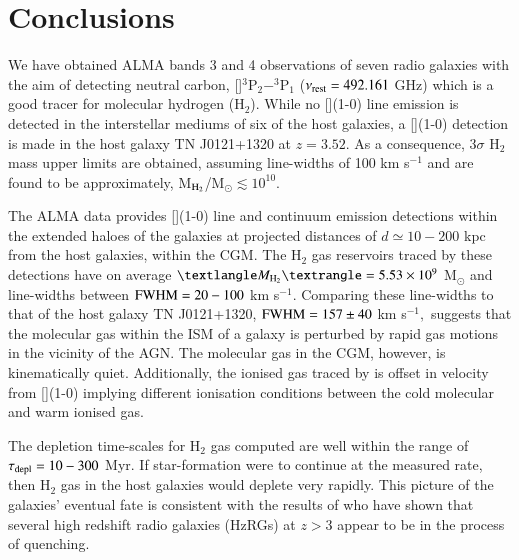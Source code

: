 \section{Conclusions}

We have obtained ALMA bands 3 and 4 observations of seven radio galaxies with the aim of detecting neutral carbon, []$^3$P$_2 - ^3$P$_1$ ($\nu_{\rm rest} = 492.161$ GHz) which is a good tracer for molecular hydrogen (H$_2$). While no [](1-0) line emission is detected in the interstellar mediums of six of the host galaxies, a [](1-0) detection is made in the host galaxy TN J0121+1320 at $z=3.52.$ As a consequence, $3\sigma$ H$_2$ mass upper limits are obtained, assuming line-widths of 100 km s$^{-1}$ and are found to be approximately, M$_{\rm H_2}$/M$_\odot \lesssim 10^{10}.$ 

The ALMA data provides [](1-0) line and continuum emission detections within the extended haloes of the galaxies at projected distances of $d\simeq 10 - 200$ kpc from the host galaxies, within the CGM. The H$_2$ gas reservoirs traced by these detections have on average $\textlangle M_{\rm H_2} \textrangle = 5.53\e{9}$ M$_\odot$ and line-widths between $\rm FWHM = 20 - 100$ km s$^{-1}.$ Comparing these line-widths to that of the host galaxy TN J0121+1320, $\rm FWHM = 157\pm40$ km s$^{-1},$ suggests that the molecular gas within the ISM of a galaxy is perturbed by rapid gas motions in the vicinity of the AGN. The molecular gas in the CGM, however, is kinematically quiet. Additionally, the ionised gas traced by  is offset in velocity from [](1-0) implying different ionisation conditions between the cold molecular and warm ionised gas.

The depletion time-scales for H$_2$ gas computed are well within the range of $\tau_{\rm depl} = 10 - 300$ Myr. If star-formation were to continue at the measured rate, then H$_2$ gas in the host galaxies would deplete very rapidly. This picture of the galaxies' eventual fate is consistent with the results of \citet{falkendal2019} who have shown that several high redshift radio galaxies (HzRGs) at $z>3$ appear to be in the process of quenching. 